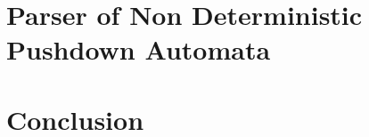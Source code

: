 \documentclass[a4paper,USenglish]{lipics}
\begin{document}
\section{Parser of Non Deterministic Pushdown Automata}
\label{Section:bridge}

\section{Conclusion}
\label{Section:zz}
%

\small
%

\end{document}
